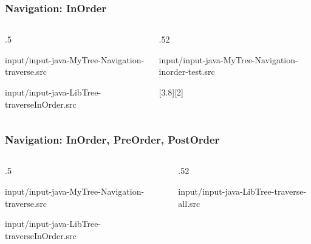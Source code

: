 \documentclass[10pt]{beamer}
\begin{document}
\begin{frame}[t]\frametitle{Navigation: InOrder}
	\vspace{-0.3cm}
	\begin{columns}[T] %
	\begin{column}{.5\linewidth} %
		\vspace{-0.3cm}
		{\tiny 
			
				{input/input-java-MyTree-Navigation-traverse.src}
		} %
%			
		{\tiny 
			
				{input/input-java-LibTree-traverseInOrder.src}
		} %
	\end{column} %
	\begin{column}{.52\linewidth} %
		\vspace{-0.3cm}
		{\tiny 
			
		} %
		\vspace{-0.15cm}
		{\tiny 
			
				{input/input-java-MyTree-Navigation-inorder-test.src}
		} %
		[3.8][2]
	\end{column} %
	\end{columns} %

\end{frame}



\begin{frame}[t]\frametitle{Navigation: InOrder, PreOrder, PostOrder}
	\vspace{-0.3cm}
	\begin{columns}[T] %
	\begin{column}{.5\linewidth} %
		\vspace{-0.3cm}
		{\tiny 
			
				{input/input-java-MyTree-Navigation-traverse.src}
		} %
%			
		{\tiny 
			
				{input/input-java-LibTree-traverseInOrder.src}
		} %
	\end{column} %
	\begin{column}{.52\linewidth} %
		\vspace{-0.3cm}
%			
		{\tiny 
			
				{input/input-java-LibTree-traverse-all.src}
		} %
	\end{column} %
	\end{columns} %

\end{frame}
\end{document}
